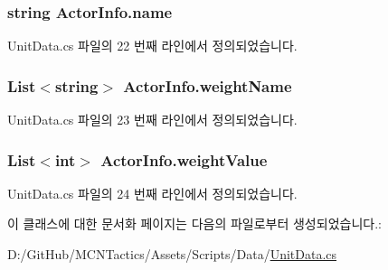 \subsubsection[{\texorpdfstring{name}{name}}]{\setlength{\rightskip}{0pt plus 5cm}string Actor\+Info.\+name}\hypertarget{class_actor_info_a2e9e540cdc037f204d80622e47543410}{}\label{class_actor_info_a2e9e540cdc037f204d80622e47543410}


Unit\+Data.\+cs 파일의 22 번째 라인에서 정의되었습니다.

\subsubsection[{\texorpdfstring{weight\+Name}{weightName}}]{\setlength{\rightskip}{0pt plus 5cm}List$<$string$>$ Actor\+Info.\+weight\+Name}\hypertarget{class_actor_info_a25bb8e0eafab630572ffddea088a1f80}{}\label{class_actor_info_a25bb8e0eafab630572ffddea088a1f80}


Unit\+Data.\+cs 파일의 23 번째 라인에서 정의되었습니다.

\subsubsection[{\texorpdfstring{weight\+Value}{weightValue}}]{\setlength{\rightskip}{0pt plus 5cm}List$<$int$>$ Actor\+Info.\+weight\+Value}\hypertarget{class_actor_info_a1c5dd2d46e5ebc5a6483f2bcb55cb162}{}\label{class_actor_info_a1c5dd2d46e5ebc5a6483f2bcb55cb162}


Unit\+Data.\+cs 파일의 24 번째 라인에서 정의되었습니다.



이 클래스에 대한 문서화 페이지는 다음의 파일로부터 생성되었습니다.\+:\begin{DoxyCompactItemize}
\item 
D\+:/\+Git\+Hub/\+M\+C\+N\+Tactics/\+Assets/\+Scripts/\+Data/\hyperlink{_unit_data_8cs}{Unit\+Data.\+cs}\end{DoxyCompactItemize}
